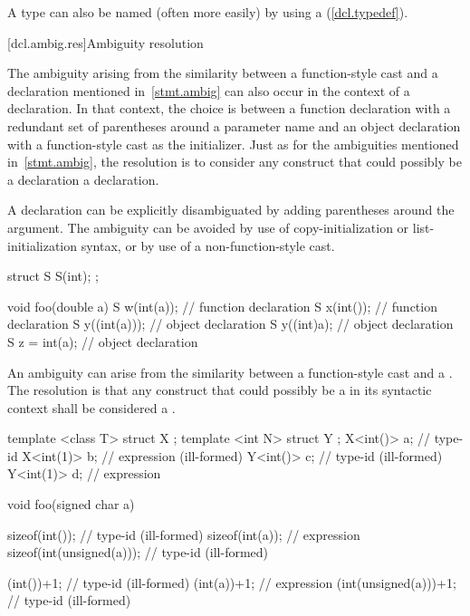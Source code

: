 \pnum
A type can also be named (often more easily) by using a
(\ref{dcl.typedef}).

[dcl.ambig.res]{Ambiguity resolution}%
%

\pnum
The ambiguity arising from the similarity between a function-style cast and
a declaration mentioned in~\ref{stmt.ambig} can also occur in the context of a declaration.
In that context, the choice is between a function declaration with
a redundant set of parentheses around a parameter name and an object declaration
with a function-style cast as the initializer.
Just as for the ambiguities mentioned in~\ref{stmt.ambig},
the resolution is to consider any construct that could possibly
be a declaration a declaration.
\begin{note}
A declaration can be explicitly disambiguated by adding parentheses
around the argument.
The ambiguity can be avoided by use of copy-initialization or
list-initialization syntax, or by use of a non-function-style cast.
\end{note}
\begin{example}
\begin{codeblock}
struct S {
  S(int);
};

void foo(double a) {
  S w(int(a));                  // function declaration
  S x(int());                   // function declaration
  S y((int(a)));                // object declaration
  S y((int)a);                  // object declaration
  S z = int(a);                 // object declaration
}
\end{codeblock}
\end{example}

\pnum
An ambiguity can arise from the similarity between a function-style
cast and a
.
The resolution is that any construct that could possibly be a
in its syntactic context shall be considered a
.
\begin{example}

\begin{codeblock}
template <class T> struct X {};
template <int N> struct Y {};
X<int()> a;                     // type-id
X<int(1)> b;                    // expression (ill-formed)
Y<int()> c;                     // type-id (ill-formed)
Y<int(1)> d;                    // expression

void foo(signed char a) {
  sizeof(int());                // type-id (ill-formed)
  sizeof(int(a));               // expression
  sizeof(int(unsigned(a)));     // type-id (ill-formed)

  (int())+1;                    // type-id (ill-formed)
  (int(a))+1;                   // expression
  (int(unsigned(a)))+1;         // type-id (ill-formed)
}
\end{codeblock}
\end{example}

